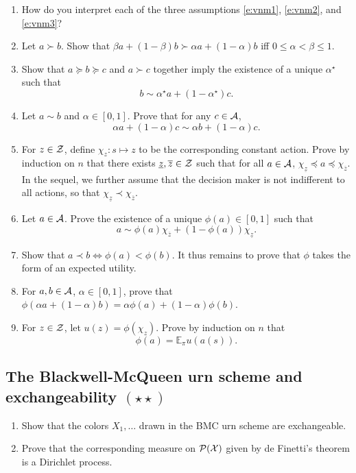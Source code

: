 \documentclass{article}
\newif\ifsolutions
\newcommand\solution[1]{
\ifsolutions
\begin{mdframed}[style=MyFrame]
\textcolor{bleu}{\textbf{Solution:} #1}
\end{mdframed}
\fi
}
\begin{document}
\begin{enumerate}
  \item How do you interpret each of the three assumptions \eqref{e:vnm1}, \eqref{e:vnm2}, and \eqref{e:vnm3}?
  \item \label{i} Let $a\succ b$. 
  Show that $\beta a +(1-\beta)b \succ \alpha a + (1-\alpha)b$ iff $0\leq \alpha<\beta\leq 1$.
  \item\label{ii} Show that $a\succeq b \succeq c$ and $a\succ c$ together imply the existence of a unique $\alpha^\star$ such that 
  $$
  b\sim \alpha^\star a + (1-\alpha^\star) c.
  $$
  \item Let $a\sim b$ and $\alpha\in[0,1]$. Prove that for any $c\in \mathcal{A}$, 
  $$ 
  \alpha a + (1-\alpha) c \sim \alpha b + (1-\alpha)c.
  $$ 
  \item For $z\in \mathcal{Z}$, define $\chi_z:s\mapsto z$ to be the corresponding constant action.
  Prove by induction on $n$ that there exists $\underline{z}, \overline{z}\in \mathcal{Z}$ such that for all $a\in\mathcal{A}$, $\chi_{\underline{z}} \preceq a \preceq \chi_{\overline{z}}$.
  In the sequel, we further assume that the decision maker is not indifferent to all actions, so that $\chi_{\underline{z}} \prec \chi_{\overline{z}}$.
  \item Let $a\in \mathcal{A}$. 
  Prove the existence of a unique $\phi(a)\in[0,1]$ such that 
  $$
  a \sim \phi(a) \chi_{\overline{z}} + (1-\phi(a)) \chi_{\underline{z}}.
  $$
  \item Show that $a\prec b \Leftrightarrow \phi(a)<\phi(b)$. 
  It thus remains to prove that $\phi$ takes the form of an expected utility.
  \item For $a, b\in\mathcal{A}$, $\alpha\in [0,1]$, prove that $\phi(\alpha a + (1-\alpha)b) = \alpha\phi(a) + (1-\alpha)\phi(b)$.
  \item For $z\in \mathcal{Z}$, let $u(z) = \phi(\chi_z)$. 
  Prove by induction on $n$ that 
  $$
  \phi(a) = \mathbb{E}_\pi u(a(s)).
  $$
\end{enumerate}
\solution{
See \citep[Section 3.4.2]{PaIn09}.
}

\subsection{The Blackwell-McQueen urn scheme and exchangeability $(\star\star)$}
\begin{enumerate}
\item Show that the colors $X_1,\dots$ drawn in the BMC urn scheme are exchangeable.
\item Prove that the corresponding measure on $\mathcal P(\mathcal{X})$ given by de Finetti's theorem is a Dirichlet process.
\end{enumerate}
\end{document}
